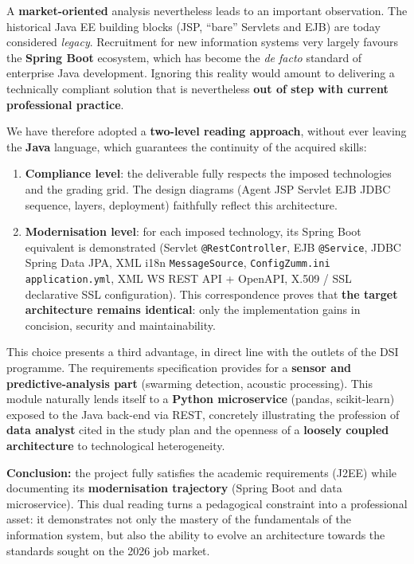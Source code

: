 A \textbf{market-oriented} analysis nevertheless leads to an important
observation. The historical Java EE building blocks (JSP, ``bare'' Servlets and
EJB) are today considered \emph{legacy}. Recruitment for new information systems
very largely favours the \textbf{Spring Boot} ecosystem, which has become the
\emph{de facto} standard of enterprise Java development. Ignoring this reality
would amount to delivering a technically compliant solution that is nevertheless
\textbf{out of step with current professional practice}.

We have therefore adopted a \textbf{two-level reading approach}, without ever
leaving the \textbf{Java} language, which guarantees the continuity of the
acquired skills:
\begin{enumerate}
  \item \textbf{Compliance level}: the deliverable fully respects the imposed
        technologies and the grading grid. The design diagrams (Agent
        \textrightarrow{} JSP \textrightarrow{} Servlet \textrightarrow{} EJB
        \textrightarrow{} JDBC sequence, layers, deployment) faithfully reflect
        this architecture.
  \item \textbf{Modernisation level}: for each imposed technology, its Spring
        Boot equivalent is demonstrated (Servlet \textrightarrow{}
        \texttt{@RestController}, EJB \textrightarrow{} \texttt{@Service}, JDBC
        \textrightarrow{} Spring Data JPA, XML i18n \textrightarrow{}
        \texttt{MessageSource}, \texttt{ConfigZumm.ini} \textrightarrow{}
        \texttt{application.yml}, XML WS \textrightarrow{} REST API + OpenAPI,
        X.509 / SSL \textrightarrow{} declarative SSL configuration). This
        correspondence proves that \textbf{the target architecture remains
        identical}: only the implementation gains in concision, security and
        maintainability.
\end{enumerate}

This choice presents a third advantage, in direct line with the outlets of the
DSI programme. The requirements specification provides for a \textbf{sensor and
predictive-analysis part} (swarming detection, acoustic processing). This module
naturally lends itself to a \textbf{Python microservice} (pandas, scikit-learn)
exposed to the Java back-end via REST, concretely illustrating the profession of
\textbf{data analyst} cited in the study plan and the openness of a
\textbf{loosely coupled architecture} to technological heterogeneity.

\begin{encadre}
\textbf{Conclusion:} the project fully satisfies the academic requirements
(J2EE) while documenting its \textbf{modernisation trajectory} (Spring Boot and
data microservice). This dual reading turns a pedagogical constraint into a
professional asset: it demonstrates not only the mastery of the fundamentals of
the information system, but also the ability to evolve an architecture towards
the standards sought on the 2026 job market.
\end{encadre}
